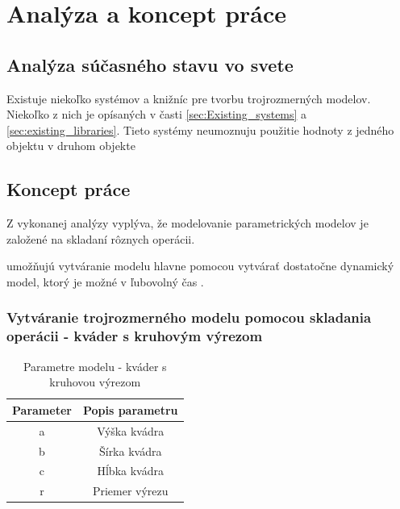 \chapter{Analýza a koncept práce}

\section{Analýza súčasného stavu vo svete}
Existuje niekoľko systémov a knižníc pre tvorbu trojrozmerných modelov. Niekoľko z nich je opísaných v časti \ref{sec:Existing_systems} a \ref{sec:existing_libraries}.
Tieto systémy neumoznuju použitie hodnoty z jedného objektu v druhom objekte

\section{Koncept práce}
Z vykonanej analýzy vyplýva, že modelovanie parametrických modelov je založené na skladaní rôznych operácii. 



umožňujú vytváranie modelu hlavne pomocou vytvárať dostatočne dynamický model, ktorý je možné v ľubovolný čas . 

\subsection*{Vytváranie trojrozmerného modelu pomocou skladania operácii - kváder s kruhovým výrezom}

\begin{table}[H]
\centering
\begin{tabular}{ |c|c| }
 \hline
 Parameter & Popis parametru \\
 \hline
 \hline
 a & Výška kvádra\\ 
  \hline
 b & Šírka kvádra \\  
  \hline
 c & Hĺbka kvádra \\  
  \hline
 r & Priemer výrezu  \\
  \hline
\end{tabular}
\caption{Parametre modelu - kváder s kruhovou výrezom}
 \label{tab:homeModel}
\end{table}


